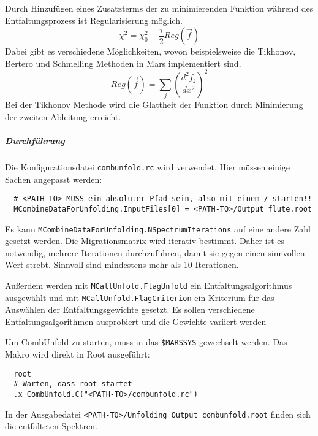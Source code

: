 Durch Hinzufügen eines Zusatzterms der zu minimierenden Funktion während des
Entfaltungsprozess ist Regularisierung möglich.
\begin{equation}
    \chi^2 = \chi^2_0 - \frac{\tau}{2} Reg(\vec{f})
\end{equation}
Dabei gibt es verschiedene Möglichkeiten,
wovon beispielsweise die Tikhonov, Bertero
und Schmelling Methoden in Mars implementiert sind.
\begin{equation}
    Reg(\vec{f}) = \sum_j {\left( \frac{d^2 f_j}{dx^2} \right)}^2
\end{equation}
Bei der Tikhonov Methode wird die Glattheit der
Funktion durch Minimierung der zweiten Ableitung erreicht.

\subparagraph{Durchführung}%

Die Konfigurationsdatei \texttt{combunfold.rc} wird verwendet.
Hier müssen einige Sachen angepasst werden:
\begin{lstlisting}
  # <PATH-TO> MUSS ein absoluter Pfad sein, also mit einem / starten!!
  MCombineDataForUnfolding.InputFiles[0] = <PATH-TO>/Output_flute.root
\end{lstlisting}
Es kann
\texttt{MCombineDataForUnfolding.NSpectrumIterations}
auf eine andere Zahl gesetzt werden.
Die Migrationsmatrix wird iterativ bestimmt. 
Daher ist es notwendig, mehrere
Iterationen durchzuführen, damit sie gegen einen sinnvollen Wert strebt. 
Sinnvoll sind mindestens mehr als 10 Iterationen. 

Außerdem werden mit
\texttt{MCallUnfold.FlagUnfold}
ein Entfaltungsalgorithmus ausgewählt und mit
\texttt{MCallUnfold.FlagCriterion}
ein Kriterium für das Auswählen der Entfaltungsgewichte gesetzt.
Es sollen verschiedene Entfaltungsalgorithmen ausprobiert
und die Gewichte variiert werden

Um CombUnfold zu starten, muss in das
\texttt{\$MARSSYS}
gewechselt werden.
Das Makro wird direkt in Root ausgeführt:
\begin{lstlisting}
  root
  # Warten, dass root startet
  .x CombUnfold.C("<PATH-TO>/combunfold.rc")
\end{lstlisting}

In der Ausgabedatei
\texttt{<PATH-TO>/Unfolding\_Output\_combunfold.root}
finden sich die entfalteten Spektren.
